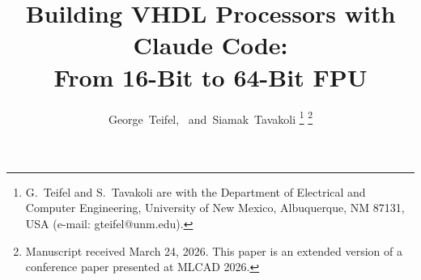 \documentclass[journal]{IEEEtran}
\begin{document}
\title{Building VHDL Processors with Claude Code:\\From 16-Bit to 64-Bit FPU}

\author{George~Teifel,~\IEEEmembership{}
        and~Siamak~Tavakoli%
\thanks{G.~Teifel and S.~Tavakoli are with the Department of Electrical
and Computer Engineering, University of New Mexico, Albuquerque, NM
87131, USA (e-mail: gteifel@unm.edu).}%
\thanks{Manuscript received March 24, 2026.  This paper is an extended
version of a conference paper presented at MLCAD 2026.}}


\maketitle
\end{document}
